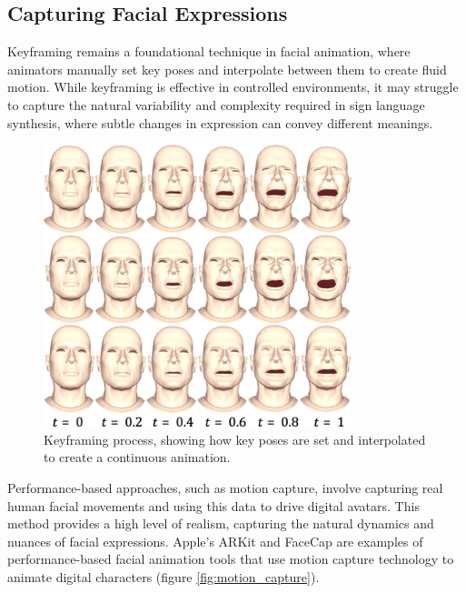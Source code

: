 \documentclass[../../main.tex]{subfiles}
\begin{document}
\subsection{Capturing Facial Expressions}
\label{ch:facial_expressions:related_work:face_rigging:capture}

Keyframing remains a foundational technique in facial animation, where animators manually set key poses and interpolate between them to create fluid motion. While keyframing is effective in controlled environments, it may struggle to capture the natural variability and complexity required in sign language synthesis, where subtle changes in expression can convey different meanings.

\begin{figure}
    \centering
    \includegraphics[width=0.8\textwidth]{chapters/facial_expressions/images/keyframing.png}
    \caption{Keyframing process, showing how key poses are set and interpolated to create a continuous animation.}
    \label{fig:keyframing}
\end{figure}

Performance-based approaches, such as motion capture, involve capturing real human facial movements and using this data to drive digital avatars. This method provides a high level of realism, capturing the natural dynamics and nuances of facial expressions. Apple's ARKit and FaceCap are examples of performance-based facial animation tools that use motion capture technology to animate digital characters (figure \ref{fig:motion_capture}).
\end{document}
